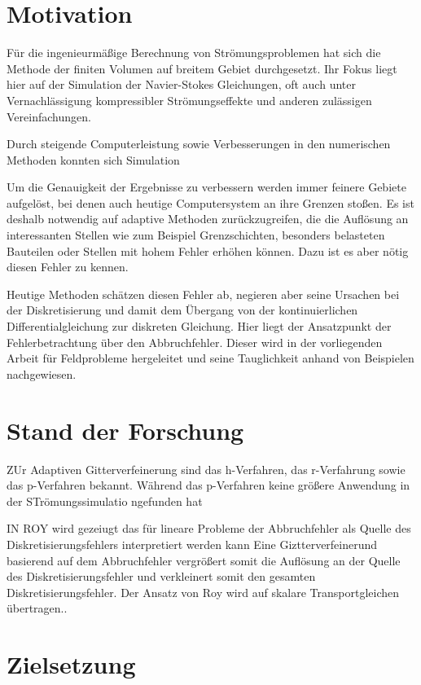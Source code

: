 \section{Motivation}
Für die ingenieurmäßige Berechnung von Strömungsproblemen hat sich die Methode der
finiten Volumen auf breitem Gebiet durchgesetzt. Ihr Fokus liegt hier auf der Simulation
der Navier-Stokes Gleichungen, oft auch unter Vernachlässigung kompressibler Strömungseffekte und
anderen zulässigen Vereinfachungen.

Durch steigende Computerleistung sowie Verbesserungen in den numerischen Methoden konnten
sich Simulation

Um die Genauigkeit der Ergebnisse zu verbessern werden immer feinere Gebiete aufgelöst,
bei denen auch heutige Computersystem an ihre Grenzen stoßen. Es ist deshalb notwendig
auf adaptive Methoden zurückzugreifen, die die Auflösung an interessanten Stellen wie
zum Beispiel Grenzschichten, besonders belasteten Bauteilen oder Stellen mit hohem Fehler
erhöhen können. Dazu ist es aber nötig diesen Fehler zu kennen.

Heutige Methoden schätzen diesen Fehler ab, negieren aber seine Ursachen bei der Diskretisierung
und damit dem Übergang von der kontinuierlichen Differentialgleichung zur diskreten Gleichung.
Hier liegt der Ansatzpunkt der Fehlerbetrachtung über den Abbruchfehler. Dieser wird in der
vorliegenden Arbeit für Feldprobleme hergeleitet und seine Tauglichkeit anhand
von Beispielen nachgewiesen.

\section{Stand der Forschung}

ZUr Adaptiven Gitterverfeinerung sind das h-Verfahren, das r-Verfahrung sowie das p-Verfahren bekannt.
Während das p-Verfahren keine größere Anwendung in der STrömungssimulatio ngefunden hat


IN ROY wird gezeiugt das für lineare Probleme der Abbruchfehler
als Quelle des Diskretisierungsfehlers interpretiert werden kann
Eine Giztterverfeinerund basierend auf dem Abbruchfehler
vergrößert somit die Auflösung an der Quelle des Diskretisierungsfehler
und verkleinert somit den gesamten Diskretisierungsfehler.
Der Ansatz von Roy wird auf skalare Transportgleichen übertragen..

\section{Zielsetzung}
\cleardoublepage
